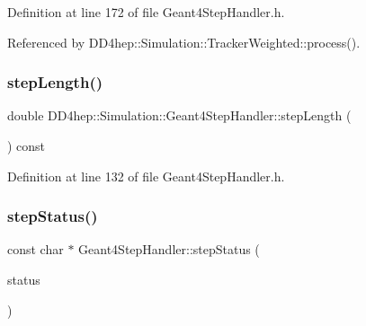 Definition at line 172 of file Geant4\+Step\+Handler.\+h.



Referenced by D\+D4hep\+::\+Simulation\+::\+Tracker\+Weighted\+::process().

\hypertarget{class_d_d4hep_1_1_simulation_1_1_geant4_step_handler_a4d10cc802cc8a07492695d7aff68a87f}{}\label{class_d_d4hep_1_1_simulation_1_1_geant4_step_handler_a4d10cc802cc8a07492695d7aff68a87f} 
\subsubsection{\texorpdfstring{step\+Length()}{stepLength()}}
{\footnotesize\ttfamily double D\+D4hep\+::\+Simulation\+::\+Geant4\+Step\+Handler\+::step\+Length (\begin{DoxyParamCaption}{ }\end{DoxyParamCaption}) const\hspace{0.3cm}{\ttfamily [inline]}}



Definition at line 132 of file Geant4\+Step\+Handler.\+h.

\hypertarget{class_d_d4hep_1_1_simulation_1_1_geant4_step_handler_a749fffe231a34f253d498edf989ae035}{}\label{class_d_d4hep_1_1_simulation_1_1_geant4_step_handler_a749fffe231a34f253d498edf989ae035} 
\subsubsection{\texorpdfstring{step\+Status()}{stepStatus()}}
{\footnotesize\ttfamily const char $\ast$ Geant4\+Step\+Handler\+::step\+Status (\begin{DoxyParamCaption}\item[{G4\+Step\+Status}]{status }\end{DoxyParamCaption})\hspace{0.3cm}{\ttfamily [static]}}



